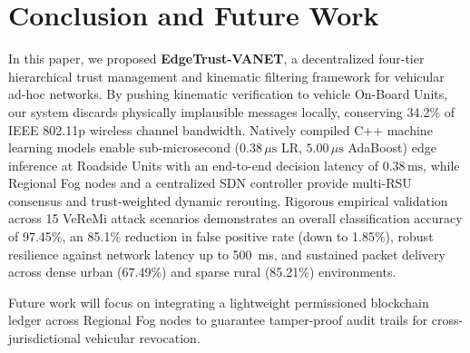 \documentclass[conference]{IEEEtran}
\begin{document}
\section{Conclusion and Future Work}

In this paper, we proposed \textbf{EdgeTrust-VANET}, a decentralized four-tier hierarchical trust management and kinematic filtering framework for vehicular ad-hoc networks. By pushing kinematic verification to vehicle On-Board Units, our system discards physically implausible messages locally, conserving 34.2\% of IEEE 802.11p wireless channel bandwidth. Natively compiled C++ machine learning models enable sub-microsecond ($0.38\,\mu\text{s}$ LR, $5.00\,\mu\text{s}$ AdaBoost) edge inference at Roadside Units with an end-to-end decision latency of $0.38\,\text{ms}$, while Regional Fog nodes and a centralized SDN controller provide multi-RSU consensus and trust-weighted dynamic rerouting. Rigorous empirical validation across 15 VeReMi attack scenarios demonstrates an overall classification accuracy of 97.45\%, an 85.1\% reduction in false positive rate (down to 1.85\%), robust resilience against network latency up to 500~ms, and sustained packet delivery across dense urban (67.49\%) and sparse rural (85.21\%) environments.

Future work will focus on integrating a lightweight permissioned blockchain ledger across Regional Fog nodes to guarantee tamper-proof audit trails for cross-jurisdictional vehicular revocation.

\balance

\end{document}
